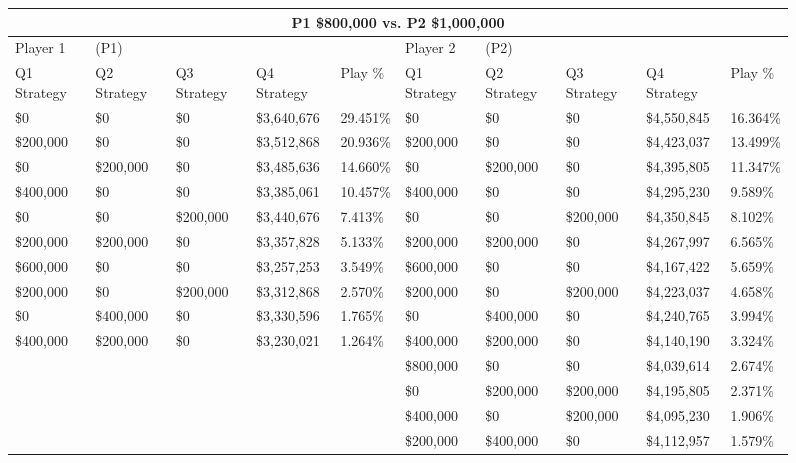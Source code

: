 \documentclass[11pt]{article}
\begin{document}
\begin{figure}
\tiny
\begin{tabular}{ |p{1.0cm}p{1.0cm}p{1.0cm}p{2.0cm}|p{1.0cm}||p{1.0cm}p{1.0cm}p{1.0cm}p{2.0cm}|p{1.0cm}|}
\hline
\multicolumn{10}{|c|}{P1 \$800,000 vs. P2 \$1,000,000} \\
\hline
Player 1 & (P1) & & & & Player 2 & (P2) & & & \\
\hline
Q1 Strategy & Q2 Strategy & Q3 Strategy & Q4 Strategy  &  Play \% & Q1 Strategy & Q2 Strategy & Q3 Strategy & Q4 Strategy  &  Play \%\\
\hline
\$0 & \$0 & \$0 & \$3,640,676 & 29.451\%            & \$0 & \$0 & \$0 & \$4,550,845 & 16.364\% \\
\$200,000 & \$0 & \$0 & \$3,512,868 & 20.936\%      & \$200,000 & \$0 & \$0 & \$4,423,037 & 13.499\% \\
\$0 & \$200,000 & \$0 & \$3,485,636 & 14.660\%      & \$0 & \$200,000 & \$0 & \$4,395,805 & 11.347\%\\
\$400,000 & \$0 & \$0 & \$3,385,061 & 10.457\%      & \$400,000 & \$0 & \$0 & \$4,295,230 & 9.589\% \\
\$0 & \$0 & \$200,000 & \$3,440,676 & 7.413\%       & \$0 & \$0 & \$200,000 & \$4,350,845 & 8.102\% \\
\$200,000 & \$200,000 & \$0 & \$3,357,828 & 5.133\% & \$200,000 & \$200,000 & \$0 & \$4,267,997 & 6.565\% \\
\$600,000 & \$0 & \$0 & \$3,257,253 & 3.549\%       & \$600,000 & \$0 & \$0 & \$4,167,422 & 5.659\% \\
\$200,000 & \$0 & \$200,000 & \$3,312,868 & 2.570\% & \$200,000 & \$0 & \$200,000 & \$4,223,037 & 4.658\% \\
\$0 & \$400,000 & \$0 & \$3,330,596 & 1.765\%       & \$0 & \$400,000 & \$0 & \$4,240,765 & 3.994\% \\
\$400,000 & \$200,000 & \$0 & \$3,230,021 & 1.264\% & \$400,000 & \$200,000 & \$0 & \$4,140,190 & 3.324\% \\
& & & &                                            & \$800,000 & \$0 & \$0 & \$4,039,614 & 2.674\% \\
& & & &                                            & \$0 & \$200,000 & \$200,000 & \$4,195,805 & 2.371\% \\
& & & &                                            & \$400,000 & \$0 & \$200,000 & \$4,095,230 & 1.906\% \\
& & & &                                            & \$200,000 & \$400,000 & \$0 & \$4,112,957 & 1.579\% \\

\end{tabular}
\end{figure}
\end{document}
